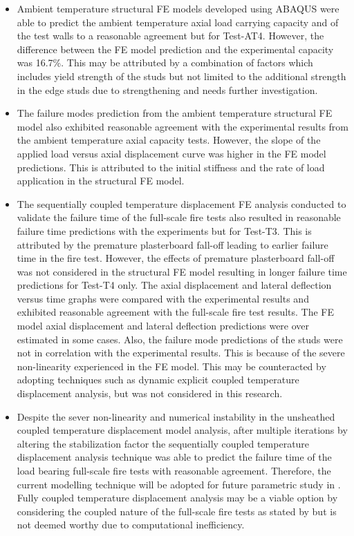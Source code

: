 \begin{itemize}
	\item Ambient temperature structural FE models developed using ABAQUS were able to predict the ambient temperature axial load carrying capacity and of the test walls to a reasonable agreement but for Test-AT4. However, the difference between the FE model prediction and the experimental capacity was 16.7\%. This may be attributed by a combination of factors which includes yield strength of the studs but not limited to the additional strength in the edge studs due to strengthening and needs further investigation. 
	\item The failure modes prediction from the ambient temperature structural FE model also exhibited reasonable agreement with the experimental results from the ambient temperature axial capacity tests. However, the slope of the applied load versus axial displacement curve was higher in the FE model predictions. This is attributed to the initial stiffness and the rate of load application in the structural FE model.     
	\item The sequentially coupled temperature displacement FE analysis conducted to validate the failure time of the full-scale fire tests also resulted in reasonable failure time predictions with the experiments but for Test-T3. This is attributed by the premature plasterboard fall-off leading to earlier failure time in the fire test. However, the effects of premature plasterboard fall-off was not considered in the structural FE model resulting in longer failure time predictions for Test-T4 only. The axial displacement and lateral deflection versus time graphs were compared with the experimental results and exhibited reasonable agreement with the full-scale fire test results. The FE model axial displacement and lateral deflection predictions were over estimated in some cases. Also, the failure mode predictions of the studs were not in correlation with the experimental results. This is because of the severe non-linearity experienced in the FE model. This may be counteracted by adopting techniques such as dynamic explicit coupled temperature displacement analysis, but was not considered in this research.  
	\item Despite the sever non-linearity and numerical instability in the unsheathed coupled temperature displacement model analysis, after multiple iterations by altering the stabilization factor the sequentially coupled temperature displacement analysis technique was able to predict the failure time of the load bearing full-scale fire tests with reasonable agreement. Therefore, the current modelling technique will be adopted for future parametric study in . Fully coupled temperature displacement analysis may be a viable option by considering the coupled nature of the full-scale fire tests as stated by \citet{Rusthi2018,Dias2019d} but is not deemed worthy due to computational inefficiency. 
\end{itemize}
